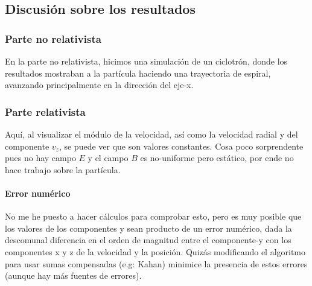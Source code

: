 \subsection{Discusión sobre los resultados}

\subsubsection{Parte no relativista} En la parte no relativista, hicimos una simulación de un ciclotrón, donde los resultados mostraban a la partícula haciendo una trayectoria de espiral, avanzando principalmente en la dirección del eje-x. 

\subsubsection{Parte relativista} Aquí, al visualizar el módulo de la velocidad, así como la velocidad radial y del componente $v_z$, se puede ver que son valores constantes. Cosa poco sorprendente pues no hay campo $E$ y el campo $B$ es no-uniforme pero estático, por ende no hace trabajo sobre la partícula.  

\paragraph{Error numérico}No me he puesto a hacer cálculos para comprobar esto, pero es muy posible que los valores de los componentes y sean producto de un error numérico, dada la descomunal diferencia en el orden de magnitud entre el componente-y con los componentes x y z de la velocidad y la posición. Quizás modificando el algoritmo para usar sumas compensadas (e.g: Kahan) minimice la presencia de estos errores (aunque hay más fuentes de errores). 